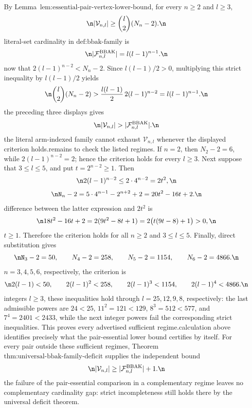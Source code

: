 By Lemma~\(\text{lem:essential-pair-vertex-lower-bound}\), for every \(n\ge 2\) and \(l\ge 3\),\n\[\n|\mathcal V_{n,l}|\ge \binom{l}{2}(N_n-2).\n\]\nThe literal-set cardinality in \(\text{def:bbak-family}\) is\n\[\n|\mathcal F^{\mathrm{BBAK}}_{n,l}|=l(l-1)^{n-1}.\n\]\nSuppose now that \(2(l-1)^{n-2}<N_n-2\). Since \(l(l-1)/2>0\), multiplying this strict inequality by \(l(l-1)/2\) yields\n\[\n\binom{l}{2}(N_n-2)>\frac{l(l-1)}{2}\,2(l-1)^{n-2}=l(l-1)^{n-1}.\n\]\nCombining the preceding three displays gives\n\[\n|\mathcal V_{n,l}|>|\mathcal F^{\mathrm{BBAK}}_{n,l}|.\n\]\nThus the literal arm-indexed family cannot exhaust \(\mathcal V_{n,l}\) whenever the displayed criterion holds.\n\nIt remains to check the listed regimes. If \(n=2\), then \(N_2-2=6\), while \(2(l-1)^{n-2}=2\); hence the criterion holds for every \(l\ge3\). Next suppose that \(3\le l\le5\), and put \(t=2^{n-2}\ge1\). Then\n\[\n2(l-1)^{n-2}\le2\cdot4^{n-2}=2t^2,\n\]\nwhereas\n\[\nN_n-2=5\cdot4^{n-1}-2^{n+2}+2=20t^2-16t+2.\n\]\nThe difference between the latter expression and \(2t^2\) is\n\[\n18t^2-16t+2=2(9t^2-8t+1)=2\bigl(t(9t-8)+1\bigr)>0,\n\]\nbecause \(t\ge1\). Therefore the criterion holds for all \(n\ge2\) and \(3\le l\le5\). Finally, direct substitution gives\n\[\nN_3-2=50,\qquad N_4-2=258,\qquad N_5-2=1154,\qquad N_6-2=4866.\n\]\nFor \(n=3,4,5,6\), respectively, the criterion is\n\[\n2(l-1)<50,\qquad 2(l-1)^2<258,\qquad 2(l-1)^3<1154,\qquad 2(l-1)^4<4866.\n\]\nFor integers \(l\ge3\), these inequalities hold through \(l=25,12,9,8\), respectively: the last admissible powers are \(24<25\), \(11^2=121<129\), \(8^3=512<577\), and \(7^4=2401<2433\), while the next integer powers fail the corresponding strict inequalities. This proves every advertised sufficient regime.\n\nThe calculation above identifies precisely what the pair-essential lower bound certifies by itself. For every pair outside these sufficient regimes, Theorem~\(\text{thm:universal-bbak-family-deficit}\) supplies the independent bound\n\[\n|\mathcal V_{n,l}|\ge |\mathcal F^{\mathrm{BBAK}}_{n,l}|+1.\n\]\nConsequently the failure of the pair-essential comparison in a complementary regime leaves no complementary cardinality gap: strict incompleteness still holds there by the universal deficit theorem.